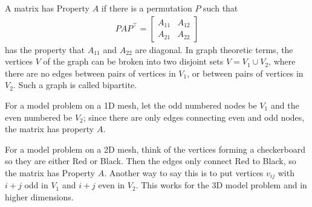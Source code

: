 \documentclass[11pt]{article}
\numberwithin{equation}{section}
\begin{document}
\begin{definition}
    A matrix has Property $A$ if there is a permutation $P$ such that
    \begin{align*}
        PAP^\top = \left[\begin{array}{ll}
            A_{11} & A_{12} \\
            A_{21} & A_{22}
            \end{array}\right]
    \end{align*}
    has the property that $A_{11}$ and $A_{22}$ are diagonal. 
    In graph theoretic terms, the vertices $V$ of the graph can be broken into two disjoint sets $V = V_1 \cup V_2$,
    where there are no edges between pairs of vertices in $V_1$, or between pairs of vertices in $V_2$. Such a graph is called bipartite.
\end{definition}

\begin{example}
    For a model problem on a 1D mesh, let the odd numbered nodes be $V_1$ and the even numbered be $V_2$; 
    since there are only edges connecting even and odd nodes, the matrix has property $A$.
\end{example}

\begin{example}
    For a model problem on a 2D mesh, think of the vertices forming a checkerboard so they are either Red or Black.
    Then the edges only connect Red to Black, so the matrix has Property $A$. 
    Another way to say this is to put vertices $v_{ij}$ with $i+j$ odd in $V_1$ and $i+j$ even in $V_2$. 
    This works for the 3D model problem and in higher dimensions.
\end{example}
\end{document}
